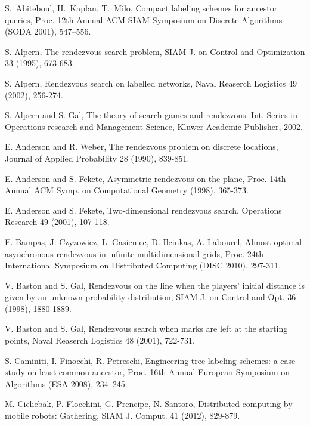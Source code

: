 \documentclass{llncs}
\begin{document}

\begin{thebibliography}{12}


S.~Abiteboul, H.~Kaplan, T.~Milo, Compact labeling schemes for ancestor
queries, Proc. 12th Annual ACM-SIAM Symposium on Discrete
Algorithms (SODA 2001), 547--556.

S. Alpern,
The rendezvous search problem,
SIAM J. on Control and Optimization 33 (1995), 673-683.


S. Alpern,
Rendezvous search on labelled networks,
Naval Reaserch Logistics 49 (2002), 256-274.

S. Alpern and S. Gal,
The theory of search games and rendezvous.
Int. Series in Operations research and Management Science,
Kluwer Academic Publisher, 2002.




E. Anderson and R. Weber,
The rendezvous problem on discrete locations,
Journal of Applied Probability 28 (1990), 839-851.

E. Anderson and S. Fekete,
Asymmetric rendezvous on the plane,
Proc. 14th Annual ACM Symp. on Computational Geometry (1998), 365-373.

E. Anderson and S. Fekete,
Two-dimensional rendezvous search,
Operations Research 49 (2001), 107-118.


E. Bampas, J. Czyzowicz, L. Gasieniec, D. Ilcinkas, A. Labourel, Almost optimal asynchronous rendezvous in infinite multidimensional grids,
Proc. 24th International Symposium on Distributed Computing (DISC 2010),  297-311.


V. Baston and S. Gal,
Rendezvous on the line when the players' initial distance is
given by an unknown probability distribution,
SIAM J. on Control and Opt. 36 (1998), 1880-1889.

V. Baston and S. Gal,
Rendezvous search when marks are left at the starting
points,
Naval Reaserch Logistics 48 (2001), 722-731.

S. Caminiti, I. Finocchi, R. Petreschi,
Engineering tree labeling schemes: a case study on least common ancestor,
Proc. 16th Annual European Symposium on Algorithms (ESA 2008), 234--245.



M. Cieliebak, P. Flocchini, G. Prencipe, N. Santoro, 
Distributed computing by mobile robots: Gathering, SIAM J. Comput. 41 (2012), 829-879.


\end{thebibliography}
\end{document}
